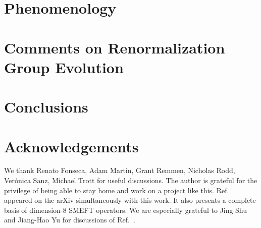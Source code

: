 \documentclass[11pt,a4paper]{article}
\begin{document}









\section{Phenomenology}
\label{sec:pheno}




\section{Comments on Renormalization Group Evolution}
\label{sec:rge}




\section{Conclusions}
\label{sec:con}





\section*{Acknowledgements}

We thank Renato Fonseca, Adam Martin, Grant Remmen, Nicholas Rodd, Ver\'onica Sanz, Michael Trott for useful discussions.
The author is grateful for the privilege of being able to stay home and work on a project like this.
Ref.~\cite{Li:2020gnx} appeared on the arXiv simultaneously with this work.
It also presents a complete basis of dimension-8 SMEFT operators.
We are especially grateful to Jing Shu and Jiang-Hao Yu for discussions of Ref.~\cite{Li:2020gnx}.
\end{document}
